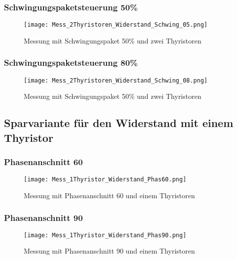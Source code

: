 \begin{appendix}
\newpage
\subsubsection*{Schwingungspaketsteuerung 50\%}

\begin{figure}[ht!]
	\centering
	\texttt{[image: Mess\_2Thyristoren\_Widerstand\_Schwing\_05.png]}	
	\caption{Messung mit Schwingungspaket 50\% und zwei Thyristoren}\label{fig:Mess_2Thyristoren_Schwing_50}
\end{figure}

\newpage
\subsubsection*{Schwingungspaketsteuerung 80\%}

\begin{figure}[ht!]
	\centering
	\texttt{[image: Mess\_2Thyristoren\_Widerstand\_Schwing\_08.png]}	
	\caption{Messung mit Schwingungspaket 50\% und zwei Thyristoren}\label{fig:Mess_2Thyristoren_Schwing_80}	
\end{figure}


\newpage
\subsection{Sparvariante für den Widerstand mit einem Thyristor} \label{sec:Sparvariante_1Thyristor}
\subsubsection*{Phasenanschnitt 60\textdegree}

\begin{figure}[ht]
	\centering
	\texttt{[image: Mess\_1Thyristor\_Widerstand\_Phas60.png]}	
	\caption{Messung mit Phasenanschnitt 60\textdegree \hspace{0.02cm} und einem Thyristoren}\label{fig:Mess_1Thyristor_Phas_60grad}
\end{figure}

\newpage
\subsubsection*{Phasenanschnitt 90\textdegree}

\begin{figure}[ht]
	\centering
	\texttt{[image: Mess\_1Thyristor\_Widerstand\_Phas90.png]}	
	\caption{Messung mit Phasenanschnitt 90\textdegree \hspace{0.02cm} und einem Thyristoren}\label{fig:Mess_1Thyristor_Phas_90grad}
\end{figure}


\end{appendix}
